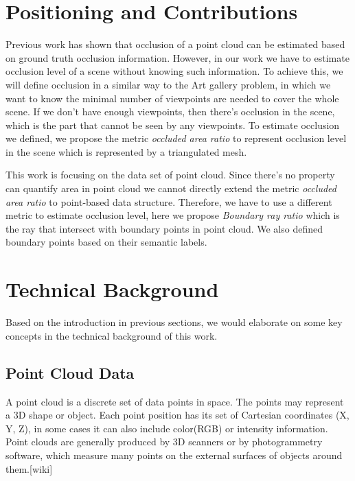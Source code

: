 \documentclass[11pt, a4paper,oneside,chapterprefix=false]{scrbook}
\newcommand{\FIXME}[1]{{\color{RED}{\textbf{FIX}: #1}}}
\begin{document}
\section{Positioning and Contributions}

Previous work has shown that occlusion of a point cloud can be estimated based on ground truth occlusion information. However, in our work we have to estimate occlusion level of a scene without knowing such information. To achieve this, we will define 
occlusion in a similar way to the Art gallery problem,\FIXME{not art gallery} in which we want to know the minimal number of viewpoints are needed to cover the whole scene. If we don't have enough viewpoints, then there's occlusion in the scene, which is the part that cannot be seen by any viewpoints. To estimate occlusion we defined, we propose the metric \textit{occluded area ratio} to represent occlusion level in the scene which is represented by a triangulated mesh. 

\vspace{10pt}

This work is focusing on the data set of point cloud. Since there's no property can quantify area in point cloud we cannot directly extend the metric \textit{occluded area ratio} to point-based data structure. Therefore, we have to use a different metric to estimate occlusion level, here we propose \textit{Boundary ray ratio} which is the ray that intersect with boundary points in point cloud. We also defined boundary points based on their semantic labels.

\section{Technical Background}

Based on the introduction in previous sections, we would elaborate on some key concepts in the technical background of this work.

\subsection{Point Cloud Data}

A point cloud is a discrete set of data points in space. The points may represent a 3D shape or object. Each point position has its set of Cartesian coordinates (X, Y, Z), in some cases it can also include color(RGB) or intensity information. Point clouds are generally produced by 3D scanners or by photogrammetry software, which measure many points on the external surfaces of objects around them.[wiki] 
\end{document}

